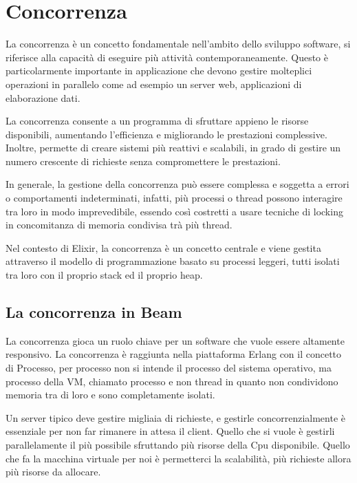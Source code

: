\section{Concorrenza}

La concorrenza è un concetto fondamentale nell'ambito
dello sviluppo software, si riferisce alla capacità
di eseguire più attività contemporaneamente.
Questo è particolarmente importante in applicazione
che devono gestire molteplici operazioni in parallelo
come ad esempio un server web, applicazioni di
elaborazione dati.

La concorrenza consente a un programma di sfruttare appieno
le risorse disponibili, aumentando l'efficienza e migliorando
le prestazioni complessive.
Inoltre, permette di creare sistemi più reattivi e
scalabili, in grado di gestire un numero crescente di
richieste senza compromettere le prestazioni.

In generale, la gestione della concorrenza può essere complessa
e soggetta a errori o comportamenti indeterminati, infatti,
più processi o thread possono interagire tra loro in modo
imprevedibile, essendo così costretti a usare tecniche di
locking in concomitanza di memoria condivisa trà più thread.

Nel contesto di Elixir, la concorrenza è un concetto centrale
e viene gestita attraverso il modello di programmazione
basato su processi leggeri, tutti isolati tra loro con il proprio
stack ed il proprio heap.


\subsection{La concorrenza in Beam}

La concorrenza gioca un ruolo chiave per un software
che vuole essere altamente responsivo.
La concorrenza è raggiunta nella piattaforma Erlang
con il concetto di Processo, per processo non si intende
il processo del sistema operativo, ma processo della
VM, chiamato processo e non thread in quanto non
condividono memoria tra di loro e sono completamente
isolati.

Un server tipico deve gestire migliaia di richieste, e
gestirle concorrenzialmente è essenziale per non far
rimanere in attesa il client. Quello che si vuole è
gestirli parallelamente il più possibile sfruttando
più risorse della Cpu disponibile.
Quello che fa la macchina virtuale per noi è permetterci
la scalabilità, più richieste allora più risorse da allocare.

